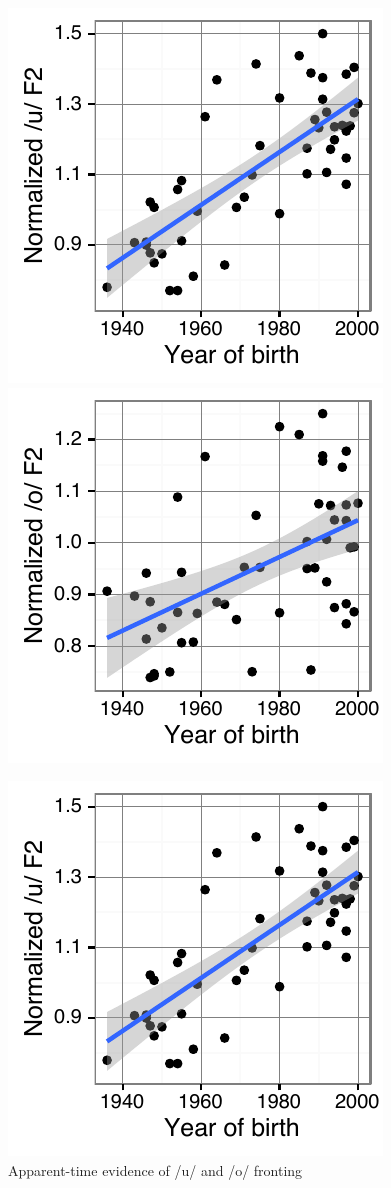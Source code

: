 \documentclass[PWPL]{article}
\begin{document}
\begin{figure}[ht]
\centering
\includegraphics[scale=0.7]{uw_yob_small.pdf}
\includegraphics[scale=0.7]{ow_yob_small.pdf}
\caption{Apparent-time evidence of /u/ and /o/ fronting}
\includegraphics[scale=0.7]{uw_yob_small.pdf}

\end{figure}
\end{document}
